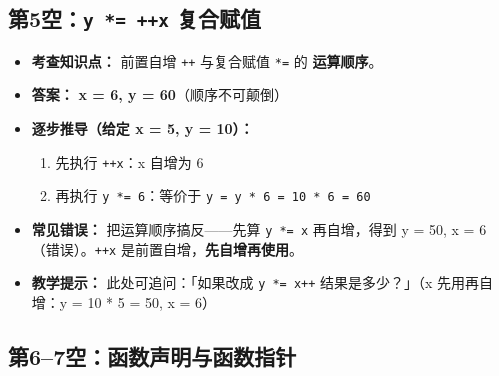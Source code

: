 \subsection{第5空：\texttt{y *= ++x} 复合赋值}

\begin{itemize}
    \item \textbf{考查知识点：} 前置自增 \texttt{++} 与复合赋值 \texttt{*=} 的 \textbf{运算顺序}。
    \item \textbf{答案：} \textbf{x = 6, y = 60}（顺序不可颠倒）
    \item \textbf{逐步推导（给定 x = 5, y = 10）：}
    \begin{enumerate}
        \item 先执行 \texttt{++x}：x 自增为 6
        \item 再执行 \texttt{y *= 6}：等价于 \texttt{y = y * 6 = 10 * 6 = 60}
    \end{enumerate}
    \item \textbf{常见错误：} 把运算顺序搞反——先算 \texttt{y *= x} 再自增，得到 y = 50, x = 6（错误）。\texttt{++x} 是前置自增，\textbf{先自增再使用}。
    \item \textbf{教学提示：} 此处可追问：「如果改成 \texttt{y *= x++} 结果是多少？」（x 先用再自增：y = 10 * 5 = 50, x = 6）
\end{itemize}

\subsection{第6--7空：函数声明与函数指针}

